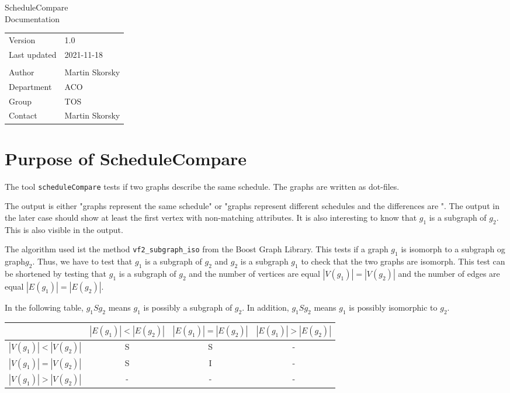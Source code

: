 \documentclass[12pt,a4paper]{report}
\begin{document}
\begin{titlepage}
\begin{center}
\vspace{2em}
\Huge{ScheduleCompare}\\[2cm]
\Large{Documentation}\\[2cm]
\begin{large}
\begin{tabularx}{\textwidth}{Xl}
Version & 1.0\\
Last updated & 2021-11-18\\
\vspace{1.5cm}\\
Author & Martin Skorsky\\
Department & ACO \\
Group & TOS\\
Contact & Martin Skorsky
\end{tabularx}%
\end{large}

\vfill

\end{center}
\end{titlepage}
\tableofcontents
\chapter{Purpose of ScheduleCompare}
The tool \texttt{scheduleCompare} tests if two graphs describe the same schedule. The graphs are written as dot-files.

The output is either "graphs represent the same schedule" or "graphs represent different schedules and the differences are \textellipsis".
The output in the later case should show at least the first vertex with non-matching attributes.
It is also interesting to know that $g_1$ is a subgraph of $g_2$. This is also visible in the output.

The algorithm used ist the method \texttt{vf2\_subgraph\_iso} from the Boost Graph Library. This tests if a graph $g_1$ is isomorph
to a subgraph og graph$g_2$. Thus, we have to test that $g_1$ is a subgraph of $g_2$ and $g_2$ is a subgraph $g_1$ to check
that the two graphs are isomorph. This test can be shortened by testing that $g_1$ is a subgraph of $g_2$ and the number
of vertices are equal $|V(g_1)| = |V(g_2)|$ and the number of edges are equal $|E(g_1)| = |E(g_2)|$.

In the following table, $g_1 S g_2$
means $g_1$ is possibly a subgraph of $g_2$. In addition, $g_1 S g_2$ means $g_1$ is possibly isomorphic to $g_2$.
\begin{table}
\label{tab:cardinalities}
\begin{tabular}[t]{|c|ccc|}
\hline
                     & $|E(g_1)|<|E(g_2)|$ & $|E(g_1)|=|E(g_2)|$ & $|E(g_1)|>|E(g_2)|$ \\ \hline
 $|V(g_1)|<|V(g_2)|$ &          S          &          S          &          -  \\
 $|V(g_1)|=|V(g_2)|$ &          S          &          I          &          -  \\
 $|V(g_1)|>|V(g_2)|$ &          -          &          -          &          -  \\ \hline
\end{tabular}
\end{table}
\end{document}
